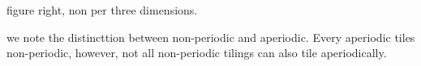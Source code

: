 


figure right, non per three dimensions. 






we note the distincttion between non-periodic and aperiodic. Every aperiodic tiles non-periodic, however, not all non-periodic tilings can also tile aperiodically. 

